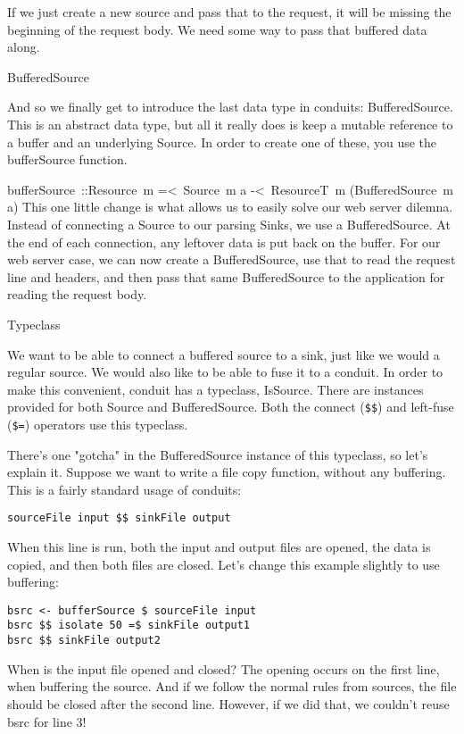 If we just create a new source and pass that to the request, it will be missing the
beginning
of the request body. We need some way to pass that buffered data along.

BufferedSource

And so we finally get to introduce the last data type in conduits:
BufferedSource. This is an abstract data type, but all it really does is keep a
mutable reference to a buffer and an underlying Source. In order to create one
of these, you use the bufferSource function.

bufferSource ::Resource m =< Source m a -< ResourceT m (BufferedSource m a)
This one little change is what allows us to easily solve our web server dilemna. Instead
of
connecting a Source to our parsing Sinks, we use a
BufferedSource. At the end of each connection, any leftover data is put back on
the buffer. For our web server case, we can now create a BufferedSource, use
that to read the request line and headers, and then pass that same
BufferedSource to the application for reading the request body.

Typeclass

We want to be able to connect a buffered source to a sink, just like we would a regular
source.
We would also like to be able to fuse it to a conduit. In order to make this convenient,
conduit
has a typeclass, IsSource. There are instances provided for both
Source and BufferedSource. Both the connect
(\verb#$$#) and left-fuse (\verb#$=#) operators use this typeclass.

There's one "gotcha" in the BufferedSource instance of this typeclass, so
let's explain it. Suppose we want to write a file copy function, without any buffering.
This is a
fairly standard usage of conduits:
\begin{lstlisting}
sourceFile input $$ sinkFile output
\end{lstlisting}
When this line is run, both the input and output files are opened, the data is copied, and
then
both files are closed. Let's change this example slightly to use buffering:
\begin{lstlisting}
bsrc <- bufferSource $ sourceFile input
bsrc $$ isolate 50 =$ sinkFile output1
bsrc $$ sinkFile output2
\end{lstlisting}
When is the input file opened and closed? The opening occurs on the first line, when
buffering
the source. And if we follow the normal rules from sources, the file should be closed
after the
second line. However, if we did that, we couldn't reuse bsrc for line 3!

